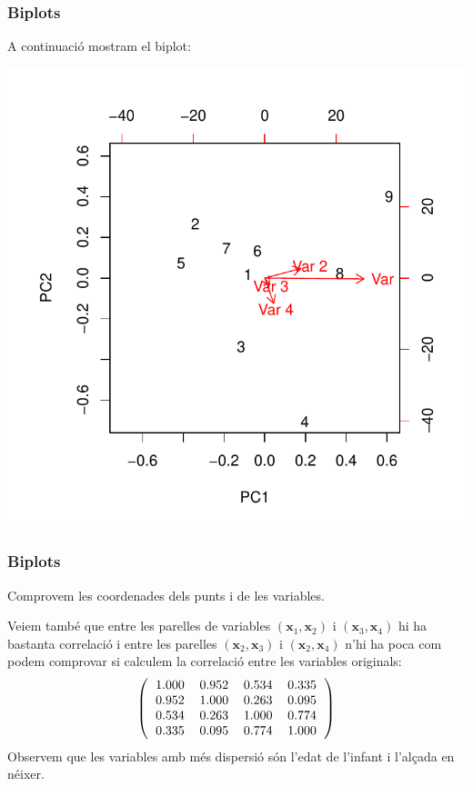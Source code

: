 \documentclass[12pt,t]{beamer}
\theoremstyle{plain}
\theoremstyle{definition}
\begin{document}
\begin{frame}
\frametitle{Biplots}
A continuació mostram el biplot:
\vspace*{0cm}

\includegraphics{ACP2print-072}
\end{frame}

\begin{frame}
\frametitle{Biplots}
Comprovem les coordenades dels punts i de les variables.
\medskip

Veiem també que entre les parelles de variables $(\mathbf{x}_1, \mathbf{x}_2)$ i   $(\mathbf{x}_3,\mathbf{x}_4)$ hi ha 
bastanta correlació i entre les parelles $(\mathbf{x}_2, \mathbf{x}_3)$ i $(\mathbf{x}_2, \mathbf{x}_4)$ n'hi ha poca 
com podem comprovar si calculem la correlació entre les variables originals:
\[
\left(
\begin{tabular}{rrrr}
  1.000 & 0.952 & 0.534 & 0.335 \\ 
  0.952 & 1.000 & 0.263 & 0.095 \\ 
  0.534 & 0.263 & 1.000 & 0.774 \\ 
  0.335 & 0.095 & 0.774 & 1.000 \\ 
  \end{tabular}\right)
\]
Observem que les variables amb més dispersió són l'edat de l'infant i l'alçada en néixer.
\end{frame}
\end{document}
